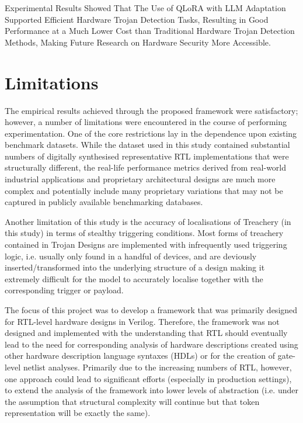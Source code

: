 \documentclass[12pt,a4paper]{report}
\begin{document}
Experimental Results Showed That The Use of QLoRA with LLM Adaptation Supported Efficient Hardware Trojan Detection Tasks, Resulting in Good Performance at a Much Lower Cost than Traditional Hardware Trojan Detection Methods, Making Future Research on Hardware Security More Accessible.

\section{Limitations}

The empirical results achieved through the proposed framework were satisfactory; however, a number of limitations were encountered in the course of performing experimentation. One of the core restrictions lay in the dependence upon existing benchmark datasets. While the dataset used in this study contained substantial numbers of digitally synthesised representative RTL implementations that were structurally different, the real-life performance metrics derived from real-world industrial applications and proprietary architectural designs are much more complex and potentially include many proprietary variations that may not be captured in publicly available benchmarking databases.

Another limitation of this study is the accuracy of localisations of Treachery (in this study) in terms of stealthy triggering conditions. Most forms of treachery contained in Trojan Designs are implemented with infrequently used triggering logic, i.e. usually only found in a handful of devices, and are deviously inserted/transformed into the underlying structure of a design making it extremely difficult for the model to accurately localise together with the corresponding trigger or payload.

The focus of this project was to develop a framework that was primarily designed for RTL-level hardware designs in Verilog. Therefore, the framework was not designed and implemented with the understanding that RTL should eventually lead to the need for corresponding analysis of hardware descriptions created using other hardware description language syntaxes (HDLs) or for the creation of gate-level netlist analyses. Primarily due to the increasing numbers of RTL, however, one approach could lead to significant efforts (especially in production settings), to extend the analysis of the framework into lower levels of abstraction (i.e. under the assumption that structural complexity will continue but that token representation will be exactly the same).
\end{document}
